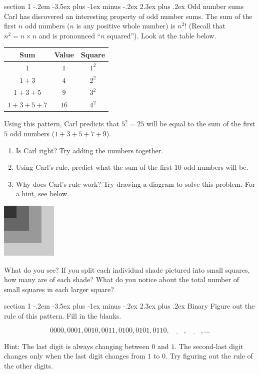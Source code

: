 \documentclass[12pt,letterpaper]{article}
\makeatletter
\newenvironment{problem}{\@startsection
       {section}
       {1}
       {-.2em}
       {-3.5ex plus -1ex minus -.2ex}
       {2.3ex plus .2ex}
       {\pagebreak[3]
       \large\bf\noindent{Problem }
       }
       }
\makeatother
\begin{document}
\begin{problem}{Odd number sums}
 Carl has discovered an interesting property of odd number sums.
 The sum of the first $n$ odd numbers ($n$ is any positive whole number) is $n^2$!
 (Recall that $n^2=n \times n$ and is pronounced ``$n$ squared'').
 Look at the table below.
 
 \begin{center}
  \begin{tabular}{|c|c|c|}
  \hline
   Sum & Value & Square \\
  \hline
   $1$ & $1$ & $1^2$ \\
   $1 + 3$ & $4$ & $2^2$ \\
   $1 + 3 + 5$ & $9$ & $3^2$ \\
   $1 + 3 + 5 + 7$ & $16$ & $4^2$ \\
   \hline
  \end{tabular}
 \end{center}

 Using this pattern, Carl predicts that $5^2=25$ will be equal to the sum of the first $5$ odd numbers ($1+3+5+7+9$).
 
 \begin{enumerate}
  \item Is Carl right? Try adding the numbers together.
  \item Using Carl's rule, predict what the sum of the first $10$ odd numbers will be.
  \item Why does Carl's rule work? Try drawing a diagram to solve this problem. For a hint, see below.
 \end{enumerate}
 
 \begin{center}
  \includegraphics[width=100px]{hint.png}
 \end{center}

 What do you see? If you split each individual shade pictured into small squares,
 how many are of each shade? What do you notice about the total number of small
 squares in each larger square?

\end{problem}

\begin{problem}{Binary}
 Figure out the rule of this pattern. Fill in the blanks.
 
 \[
  0000, 0001, 0010, 0011, 0100, 0101, 0110, \underline{\hspace{2em}}, \underline{\hspace{2em}}, \ldots
 \]
 
 Hint: The last digit is always changing between $0$ and $1$. The second-last digit changes only when
 the last digit changes from $1$ to $0$. Try figuring out the rule of the other digits.
\end{problem}
\end{document}
